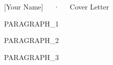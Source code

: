 \documentclass[11pt, a4paper]{awesome-cv}
\begin{document}
\makecvheader[C]

\makecvfooter
  {}
  {[Your Name]~~~·~~~Cover Letter}
  {}

\makelettertitle

\begin{cvletter}

{{PARAGRAPH_1}}

{{PARAGRAPH_2}}

{{PARAGRAPH_3}}

\end{cvletter}

\makeletterclosing
\end{document}

